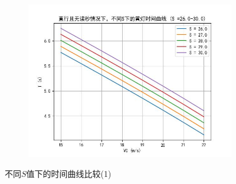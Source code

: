 \documentclass[withoutpreface,bwprint]{cumcmthesis}
\begin{document}
\begin{enumerate}
\begin{figure}[htbp!]
\begin{subfigure}[t]{0.45\textwidth}
			\includegraphics[width=\textwidth]{pics/Time_Curve_S_WOCT_STR30.00}
			\label{fig:S30_WOCT}
		\end{subfigure}
		\caption{不同$S$值下的时间曲线比较(1)}
		\label{fig:T1}
	\end{figure}
	

\end{enumerate}
\end{document}

